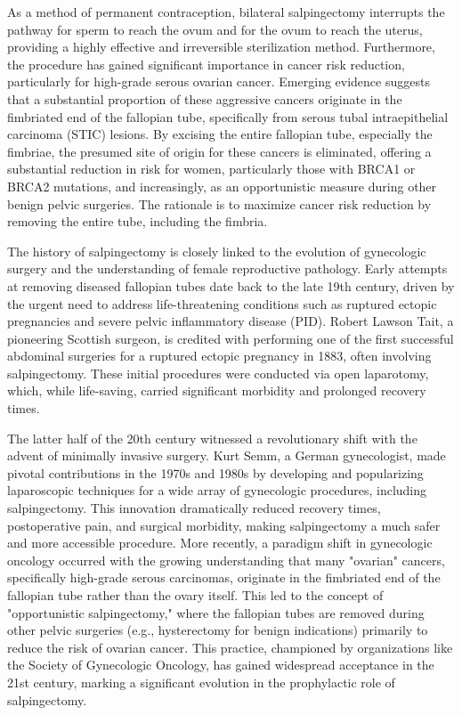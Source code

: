 As a method of permanent contraception, bilateral salpingectomy interrupts the pathway for sperm to reach the ovum and for the ovum to reach the uterus, providing a highly effective and irreversible sterilization method. Furthermore, the procedure has gained significant importance in cancer risk reduction, particularly for high-grade serous ovarian cancer. Emerging evidence suggests that a substantial proportion of these aggressive cancers originate in the fimbriated end of the fallopian tube, specifically from serous tubal intraepithelial carcinoma (STIC) lesions. By excising the entire fallopian tube, especially the fimbriae, the presumed site of origin for these cancers is eliminated, offering a substantial reduction in risk for women, particularly those with BRCA1 or BRCA2 mutations, and increasingly, as an opportunistic measure during other benign pelvic surgeries. The rationale is to maximize cancer risk reduction by removing the entire tube, including the fimbria.

The history of salpingectomy is closely linked to the evolution of gynecologic surgery and the understanding of female reproductive pathology. Early attempts at removing diseased fallopian tubes date back to the late 19th century, driven by the urgent need to address life-threatening conditions such as ruptured ectopic pregnancies and severe pelvic inflammatory disease (PID). Robert Lawson Tait, a pioneering Scottish surgeon, is credited with performing one of the first successful abdominal surgeries for a ruptured ectopic pregnancy in 1883, often involving salpingectomy. These initial procedures were conducted via open laparotomy, which, while life-saving, carried significant morbidity and prolonged recovery times.

The latter half of the 20th century witnessed a revolutionary shift with the advent of minimally invasive surgery. Kurt Semm, a German gynecologist, made pivotal contributions in the 1970s and 1980s by developing and popularizing laparoscopic techniques for a wide array of gynecologic procedures, including salpingectomy. This innovation dramatically reduced recovery times, postoperative pain, and surgical morbidity, making salpingectomy a much safer and more accessible procedure. More recently, a paradigm shift in gynecologic oncology occurred with the growing understanding that many "ovarian" cancers, specifically high-grade serous carcinomas, originate in the fimbriated end of the fallopian tube rather than the ovary itself. This led to the concept of "opportunistic salpingectomy," where the fallopian tubes are removed during other pelvic surgeries (e.g., hysterectomy for benign indications) primarily to reduce the risk of ovarian cancer. This practice, championed by organizations like the Society of Gynecologic Oncology, has gained widespread acceptance in the 21st century, marking a significant evolution in the prophylactic role of salpingectomy.

